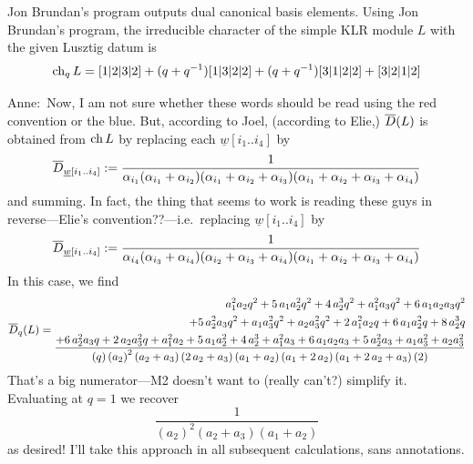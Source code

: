 \documentclass[11pt]{article}
\newcommand{\anne}[1]{{\color{pink!50!blue}Anne:~#1}}
\begin{document}
\begin{description}
Jon Brundan's program outputs dual canonical basis elements.
Using Jon Brundan's program, the irreducible character of the simple KLR module $L$ with the given Lusztig datum is 
\[
    \operatorname{ch}_q L = [1|2|3|2]+(q+q^{-1})[1|3|2|2]+(q+q^{-1})[3|1|2|2]+[3|2|1|2]
\]
\anne{Now, I am not sure whether these words should be read using the red convention or the blue. But, according to Joel, (according to Elie,) $\overline{D}(L)$  is obtained from $\operatorname{ch} L$ by replacing each $\underline{w}[i_1..i_4]$ by 
$$\overline{D}_{\underline{w}[i_1..i_4]}:= \frac 1 {\alpha_{i_1}(\alpha_{i_1} + \alpha_{i_2})(\alpha_{i_1} + \alpha_{i_2} + \alpha_{i_3})(\alpha_{i_1}+\alpha_{i_2} + \alpha_{i_3}+\alpha_{i_4})}$$ and summing. In fact, the thing that seems to work is reading these guys in reverse---Elie's convention??---i.e.\ replacing $\underline{w}[i_1..i_4]$ by 
$$\overline{D}_{\underline{w}[i_1..i_4]}:= \frac 1 {\alpha_{i_4}(\alpha_{i_3} + \alpha_{i_4})(\alpha_{i_2} + \alpha_{i_3} + \alpha_{i_4})(\alpha_{i_1}+\alpha_{i_2} + \alpha_{i_3}+\alpha_{i_4})}$$ 
In this case, we find %
{\tiny
$$
\overline{D}_q (L) =
\begin{aligned}{a}_{1}^{2}{a}_{2}q^{2}+5\,{a}_{1}{a}_{2}^{2}q^{2}+4\,{a}_{2}^{3}q^{2}+{a}_{1}^{2}{a}_{3}q^{2}+6\,{a}_{1}{a}_{2}{a}_{3}q^{2}\\
    +5\,{a}_{2}^{2}{a}_{3}q^{2}+{a}_{1}{a}_{3}^{2}q^{2}+{a}_{2}{a}_{3}^{2}q^{2}+2\,{a}_{1}^{2}{a}_{2}q+6\,{a}_{1}{a}_{2}^{2}q+8\,{a}_{2}^{3}q \\ 
    \frac{+6\,{a}_{2}^{2}{a}_{3}q+2\,{a}_{2}{a}_{3}^{2}q+{a}_{1}^{2}{a}_{2}+5\,{a}_{1}{a}_{2}^{2}+4\,{a}_{2}^{3}+{a}_{1}^{2}{a}_{3}+6\,{a}_{1}{a}_{2}{a}_{3}+5\,{a}_{2}^{2}{a}_{3}+{a}_{1}{a}_{3}^{2}+{a}_{2}{a}_{3}^{2}}{\left(q\right)\left({{a}_{2}}\right)^{2}\left({a}_{2}+{a}_{3}\right)\left(2\,{a}_{2}+{a}_{3}\right)\left({a}_{1}+{a}_{2}\right)\left({a}_{1}+2\,{a}_{2}\right)\left({a}_{1}+2\,{a}_{2}+{a}_{3}\right)\left(2\right)}
\end{aligned}
$$}
That's a big numerator---M2 doesn't want to (really can't?) simplify it. 
Evaluating at $q = 1$ we recover
$$\frac{1}{\left({{a}_{2}}\right)^{2}\left({a}_{2}+{a}_{3}\right)\left({a
      }_{1}+{a}_{2}\right)}$$
as desired! I'll take this approach in all subsequent calculations, sans annotations. 

}
\end{description}
\end{document}
